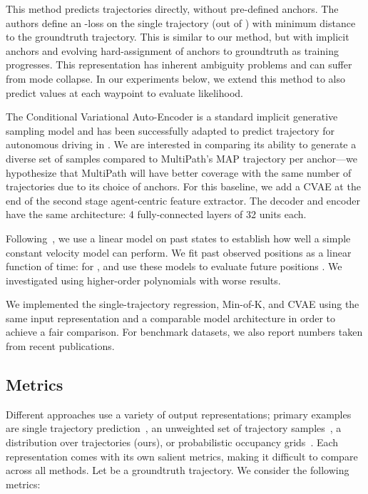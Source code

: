 \documentclass{article}
\newcommand{\multiflow}{MultiPath\xspace}
\begin{document}
 This method predicts  trajectories directly, without pre-defined anchors. The authors define an -loss on the single trajectory (out of ) with minimum distance to the groundtruth trajectory. This is similar to our method, but with implicit anchors and evolving hard-assignment of anchors to groundtruth as training progresses. This representation has inherent ambiguity problems and can suffer from mode collapse. In our experiments below, we extend this method to also predict  values at each waypoint to evaluate likelihood.

 The Conditional Variational Auto-Encoder is a standard implicit generative sampling model and has been successfully adapted to predict trajectory for autonomous driving in \cite{Lee17}. We are interested in comparing its ability to generate a diverse set of samples compared to \multiflow's MAP trajectory per anchor---we hypothesize that \multiflow will have better coverage with the same number of trajectories due to its choice of anchors. For this baseline, we add a CVAE at the end of the second stage agent-centric feature extractor. The decoder and encoder have the same architecture: 4 fully-connected layers of 32 units each.

 Following~\cite{Becker18}, we use a linear model on past states to establish how well a simple constant velocity model can perform.  We fit past observed positions as a linear function of time:  for , and use these models to evaluate future positions .  We investigated using higher-order polynomials with worse results.

We implemented the single-trajectory regression, Min-of-K, and CVAE using the same input representation and a comparable model architecture in order to achieve a fair comparison. For benchmark datasets, we also report numbers taken from recent publications.

\subsection{Metrics}
\label{sec:metrics}

Different approaches use a variety of output representations; primary examples are single trajectory prediction~\cite{Luo18}, an unweighted set of trajectory samples~\cite{Lee17}, a distribution over trajectories (ours), or probabilistic occupancy grids~\cite{Bansal19}. Each representation comes with its own salient metrics, making it difficult to compare across all methods.  Let  be a groundtruth trajectory. We consider the following metrics:
\end{document}
